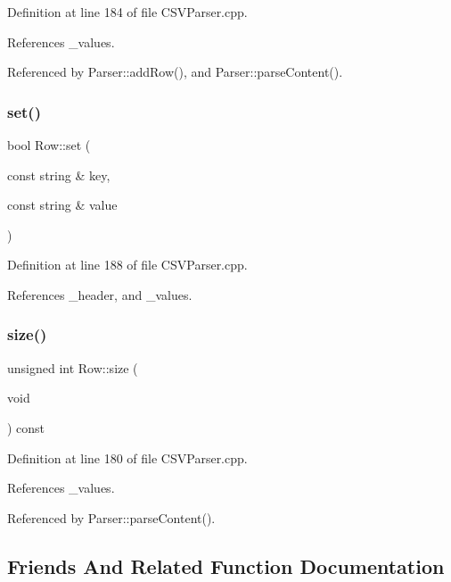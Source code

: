 Definition at line 184 of file C\+S\+V\+Parser.\+cpp.



References \+\_\+values.



Referenced by Parser\+::add\+Row(), and Parser\+::parse\+Content().

\mbox{\label{class_row_aadef50bd86334cecb389253c0561a442}} 
\subsubsection{set()}
{\footnotesize\ttfamily bool Row\+::set (\begin{DoxyParamCaption}\item[{const string \&}]{key,  }\item[{const string \&}]{value }\end{DoxyParamCaption})}



Definition at line 188 of file C\+S\+V\+Parser.\+cpp.



References \+\_\+header, and \+\_\+values.

\mbox{\label{class_row_ac3dce6d0bd64e944a932a5a26c3ebcef}} 
\subsubsection{size()}
{\footnotesize\ttfamily unsigned int Row\+::size (\begin{DoxyParamCaption}\item[{void}]{ }\end{DoxyParamCaption}) const}



Definition at line 180 of file C\+S\+V\+Parser.\+cpp.



References \+\_\+values.



Referenced by Parser\+::parse\+Content().



\subsection{Friends And Related Function Documentation}
\mbox{\label{class_row_a8962fdc6373687757234a811e803a1da}} 
